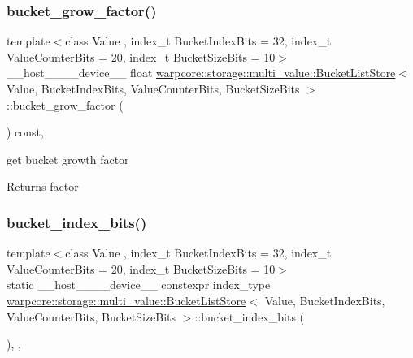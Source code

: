 \subsubsection{\texorpdfstring{bucket\+\_\+grow\+\_\+factor()}{bucket\_grow\_factor()}}
{\footnotesize\ttfamily template$<$class Value , index\+\_\+t Bucket\+Index\+Bits = 32, index\+\_\+t Value\+Counter\+Bits = 20, index\+\_\+t Bucket\+Size\+Bits = 10$>$ \\
\+\_\+\+\_\+host\+\_\+\+\_\+\+\_\+\+\_\+device\+\_\+\+\_\+ float \hyperlink{classwarpcore_1_1storage_1_1multi__value_1_1BucketListStore}{warpcore\+::storage\+::multi\+\_\+value\+::\+Bucket\+List\+Store}$<$ Value, Bucket\+Index\+Bits, Value\+Counter\+Bits, Bucket\+Size\+Bits $>$\+::bucket\+\_\+grow\+\_\+factor (\begin{DoxyParamCaption}{ }\end{DoxyParamCaption}) const\hspace{0.3cm}{\ttfamily [inline]}, {\ttfamily [noexcept]}}



get bucket growth factor 

\begin{DoxyReturn}{Returns}
factor 
\end{DoxyReturn}
\mbox{\label{classwarpcore_1_1storage_1_1multi__value_1_1BucketListStore_a0c06c0510ccdf194bda9ddffcf7fcd76}} 
\subsubsection{\texorpdfstring{bucket\+\_\+index\+\_\+bits()}{bucket\_index\_bits()}}
{\footnotesize\ttfamily template$<$class Value , index\+\_\+t Bucket\+Index\+Bits = 32, index\+\_\+t Value\+Counter\+Bits = 20, index\+\_\+t Bucket\+Size\+Bits = 10$>$ \\
static \+\_\+\+\_\+host\+\_\+\+\_\+\+\_\+\+\_\+device\+\_\+\+\_\+ constexpr index\+\_\+type \hyperlink{classwarpcore_1_1storage_1_1multi__value_1_1BucketListStore}{warpcore\+::storage\+::multi\+\_\+value\+::\+Bucket\+List\+Store}$<$ Value, Bucket\+Index\+Bits, Value\+Counter\+Bits, Bucket\+Size\+Bits $>$\+::bucket\+\_\+index\+\_\+bits (\begin{DoxyParamCaption}{ }\end{DoxyParamCaption})\hspace{0.3cm}{\ttfamily [inline]}, {\ttfamily [static]}, {\ttfamily [noexcept]}}



